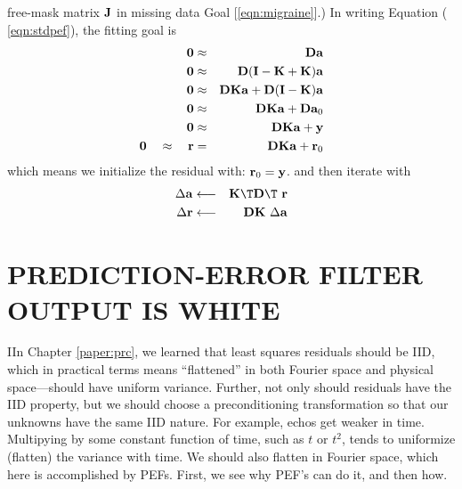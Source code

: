 free-mask matrix $\bold J$ in missing data Goal [\ref{eqn:migraine}].)
In writing Equation
( \ref{eqn:stdpef}),
the fitting goal is
\begin{eqnarray}
\bold 0  &\approx & \bold D                          \bold a            \\
\bold 0  &\approx & \bold D(\bold I-\bold K+\bold K) \bold a            \\
\bold 0  &\approx & \bold D\bold K\bold a +\bold D(\bold I-\bold K)\bold a \\
\bold 0  &\approx & \bold D\bold K\bold a +\bold D \bold a_0 \\
\bold 0  &\approx & \bold D\bold K\bold a +\bold y           \\
                                        \bold 0  \quad\approx\quad
\bold r  &=       & \bold D\bold K\bold a +\bold r_0
\label{eqn:pefregression}
\end{eqnarray}
which means we initialize the residual with:
$ \bold r_0 = \bold y$.
and then iterate with
\begin{eqnarray}
\Delta \bold a    &\longleftarrow& \bold K\T \bold D\T\        \bold r \\
\Delta \bold r    &\longleftarrow& \bold D  \bold K \ \Delta \bold a 
\end{eqnarray}



\section{PREDICTION-ERROR FILTER OUTPUT IS WHITE}
IIn Chapter \ref{paper:prc},
we learned that least squares residuals should be IID,
which in practical terms means ``flattened'' in both Fourier space and physical space---should have uniform variance.
Further, not only should residuals have the IID property,
but we should choose a preconditioning transformation
so that our unknowns have the same IID nature.
For example, echos get weaker in time.
Multipying by some constant function of time, such as $t$ or $t^2$,
tends to uniformize (flatten) the variance with time.
We should also flatten in Fourier space,
which here is accomplished by PEFs.
First, we see why PEF's can do it, and then how.
\par
{}


